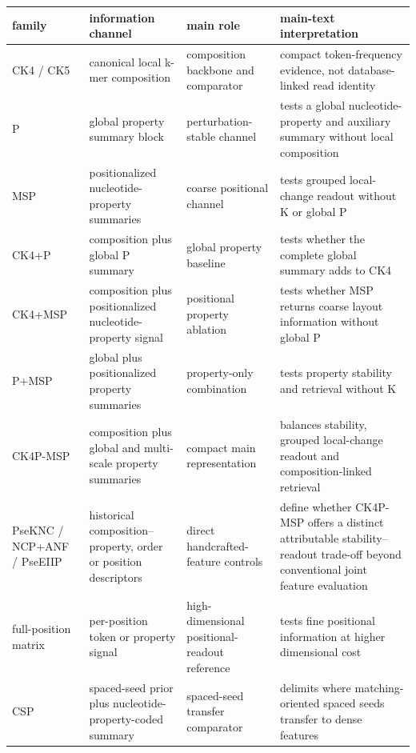 \begin{tabular}{@{}p{}p{}p{}p{}@{}}
\toprule
\textbf{family} & \textbf{information channel} & \textbf{main role} & \textbf{main-text interpretation} \\
\midrule
CK4 / CK5 & canonical local k-mer composition & composition backbone and comparator & compact token-frequency evidence, not database-linked read identity \\
P & global property summary block & perturbation-stable channel & tests a global nucleotide-property and auxiliary summary without local composition \\
MSP & positionalized nucleotide-property summaries & coarse positional channel & tests grouped local-change readout without K or global P \\
CK4+P & composition plus global P summary & global property baseline & tests whether the complete global summary adds to CK4 \\
CK4+MSP & composition plus positionalized nucleotide-property signal & positional property ablation & tests whether MSP returns coarse layout information without global P \\
P+MSP & global plus positionalized property summaries & property-only combination & tests property stability and retrieval without K \\
CK4P-MSP & composition plus global and multi-scale property summaries & compact main representation & balances stability, grouped local-change readout and composition-linked retrieval \\
PseKNC / NCP+ANF / PseEIIP & historical composition--property, order or position descriptors & direct handcrafted-feature controls & define whether CK4P-MSP offers a distinct attributable stability--readout trade-off beyond conventional joint feature evaluation \\
full-position matrix & per-position token or property signal & high-dimensional positional-readout reference & tests fine positional information at higher dimensional cost \\
CSP & spaced-seed prior plus nucleotide-property-coded summary & spaced-seed transfer comparator & delimits where matching-oriented spaced seeds transfer to dense features \\
\bottomrule
\end{tabular}
